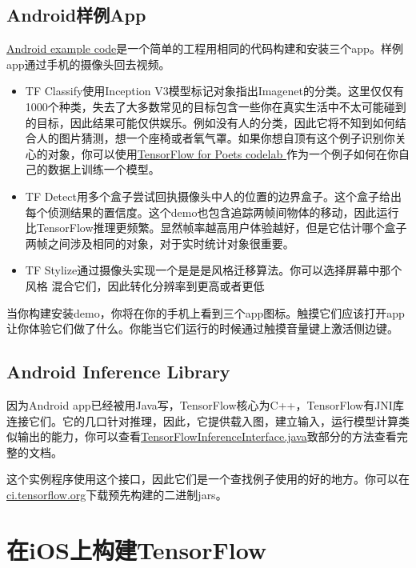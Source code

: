 \subsection{Android样例App}
\href{https://www.github.com/tensorflow/tensorflow/blob/r1.4/tensorflow/examples/android/}{Android example code}是一个简单的工程用相同的代码构建和安装三个app。样例app通过手机的摄像头回去视频。
\begin{itemize}
\item TF Classify使用Inception V3模型标记对象指出Imagenet的分类。这里仅仅有1000个种类，失去了大多数常见的目标包含一些你在真实生活中不太可能碰到的目标，因此结果可能仅供娱乐。例如没有人的分类，因此它将不知到如何结合人的图片猜测，想一个座椅或者氧气罩。如果你想自顶有这个例子识别你关心的对象，你可以使用\href{https://codelabs.developers.google.com/codelabs/tensorflow-for-poets/index.html?hl=zh-cn#0}{TensorFlow for Poets codelab }作为一个例子如何在你自己的数据上训练一个模型。
\item TF Detect用多个盒子尝试回执摄像头中人的位置的边界盒子。这个盒子给出每个侦测结果的置信度。这个demo也包含追踪两帧间物体的移动，因此运行比TensorFlow推理更频繁。显然帧率越高用户体验越好，但是它估计哪个盒子两帧之间涉及相同的对象，对于实时统计对象很重要。
\item TF Stylize通过摄像头实现一个是是是风格迁移算法。你可以选择屏幕中那个风格
混合它们，因此转化分辨率到更高或者更低
\end{itemize}
当你构建安装demo，你将在你的手机上看到三个app图标。触摸它们应该打开app让你体验它们做了什么。你能当它们运行的时候通过触摸音量键上激活侧边键。
\subsection{Android Inference Library}
因为Android app已经被用Java写，TensorFlow核心为C++，TensorFlow有JNI库连接它们。它的几口针对推理，因此，它提供载入图，建立输入，运行模型计算类似输出的能力，你可以查看\href{https://www.github.com/tensorflow/tensorflow/blob/r1.4/tensorflow/contrib/android/java/org/tensorflow/contrib/android/TensorFlowInferenceInterface.java}{TensorFlowInferenceInterface.java}致部分的方法查看完整的文档。

这个实例程序使用这个接口，因此它们是一个查找例子使用的好的地方。你可以在\href{https://ci.tensorflow.org/view/Nightly/job/nightly-android/?hl=zh-cn}{ci.tensorflow.org}下载预先构建的二进制jars。
\section{在iOS上构建TensorFlow}
